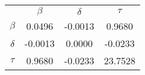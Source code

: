
		\begin{tabular}{cccc}
		& {\bf{$\beta$}} & {\bf{$\delta$}} & {\bf{$\tau$}} \\
		{\bf{$\beta$}} &		0.0496		& -0.0013		& 0.9680 \\
		 {\bf{$\delta$}} &		-0.0013		&  0.0000		& -0.0233 \\
		 {\bf{$\tau$}} &		 0.9680		& -0.0233		& 23.7528 \\
		\end{tabular}

			